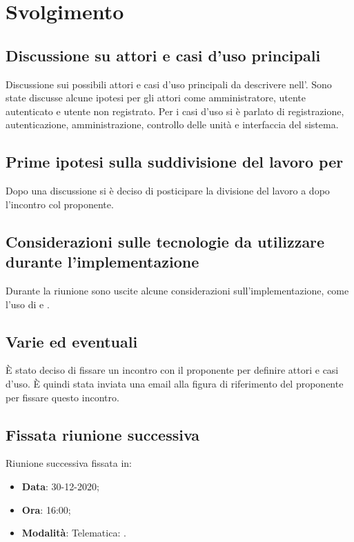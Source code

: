 \documentclass[]{article}
\begin{document}
	\newpage

	\section{Svolgimento}
		\subsection{Discussione su attori e casi d'uso principali}
        Discussione sui possibili attori e casi d'uso principali da descrivere nell'. Sono state discusse alcune ipotesi per gli attori come amministratore, utente autenticato e utente non registrato. Per i casi d'uso si è parlato di registrazione, autenticazione, amministrazione, controllo delle unità e interfaccia del sistema.\\

        \subsection{Prime ipotesi sulla suddivisione del lavoro per }
        Dopo una discussione si è deciso di posticipare la divisione del lavoro a dopo l'incontro col proponente.\\
        
        \subsection{Considerazioni sulle tecnologie da utilizzare durante l'implementazione}
        Durante la riunione sono uscite alcune considerazioni sull'implementazione, come l'uso di  e .\\
        
        \subsection{Varie ed eventuali}
        È stato deciso di fissare un incontro con il proponente per definire attori e casi d'uso. È quindi stata inviata una email alla figura di riferimento del proponente per fissare questo incontro.\\

		\subsection{Fissata riunione successiva}
		Riunione successiva fissata in:
		\begin{itemize}
			\item \textbf{Data}: 30-12-2020;
			\item \textbf{Ora}: 16:00;
			\item \textbf{Modalità}: Telematica: .
		\end{itemize}
\end{document}
